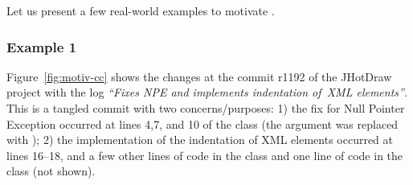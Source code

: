 Let us present a few real-world examples to motivate {\tool}.

\vspace{-6pt}
\subsubsection{Example 1}
\label{sec:example-1}

Figure~\ref{fig:motiv-cc} shows the changes at the commit r1192 of the
JHotDraw project with the log {\em ``Fixes NPE and implements
  indentation of~XML elements''}. This is a tangled commit with two
concerns/purposes: 1) the fix for Null Pointer Exception occurred at
lines 4,7, and 10 of the  class (the 
argument was replaced with ); 2) the
implementation of the indentation of XML elements occurred at lines
16--18, and a few other lines of code in the  class
and one line of code in the  class (not shown).
